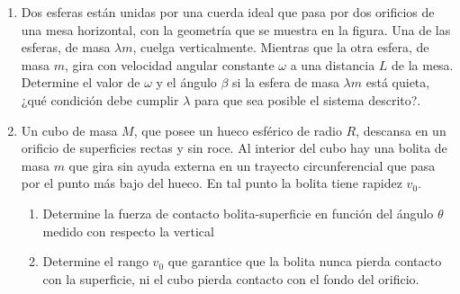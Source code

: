 \documentclass[letterpaper,11pt]{article}
\begin{document}
\begin{enumerate}
\item Dos esferas están unidas por una cuerda ideal que pasa por dos orificios de una mesa horizontal, con la geometría que se muestra en la figura. Una de las esferas, de masa $\lambda m$, cuelga verticalmente. Mientras que la otra esfera, de masa $m$, gira con velocidad angular constante $\omega$ a una distancia $L$ de la mesa. Determine el valor de $\omega$ y el ángulo $\beta$ si la esfera de masa $\lambda m$ está quieta, ¿qué condición debe cumplir $\lambda$ para que sea posible el sistema descrito?.

\begin{figure}[H]
    \centering
    
\end{figure}


\item Un cubo de masa $M$, que posee un hueco esférico de radio $R$, descansa en un orificio de superficies rectas y sin roce. Al interior del cubo hay una bolita de masa $m$ que gira sin ayuda externa en un trayecto circunferencial que pasa por el punto más bajo del hueco. En tal punto la bolita tiene rapidez $v_0$.

    \begin{enumerate}
        \item Determine la fuerza de contacto bolita-superficie en función del ángulo $\theta$ medido con respecto la vertical
        
        \item Determine el rango $v_0$ que garantice que la bolita nunca pierda contacto con la superficie, ni el cubo pierda contacto con el fondo del orificio.
    \end{enumerate}
    
\begin{figure}[H]
    \centering
    
\end{figure}


%   

\end{enumerate}
\end{document}
